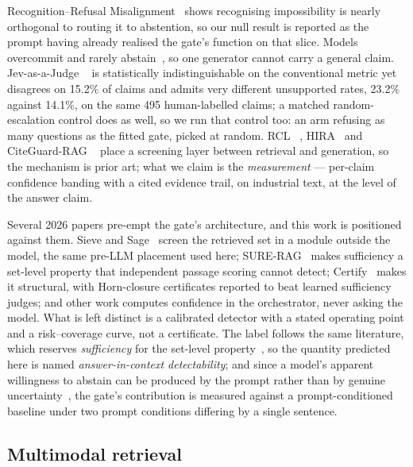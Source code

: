 \documentclass[conference]{IEEEtran}
\begin{document}
Recognition--Refusal Misalignment~\cite{du2026recognition} shows recognising
impossibility is nearly orthogonal to routing it to abstention, so our null
result is reported as the prompt having already realised the gate's function on
that slice. Models overcommit and rarely abstain~\cite{cocchieri2026overcommit},
so one generator cannot carry a general claim. Jev-as-a-Judge
~\cite{rosario2026jev} is statistically indistinguishable on the conventional
metric yet disagrees on 15.2\% of claims and admits very different unsupported
rates, 23.2\% against 14.1\%, on the same 495 human-labelled claims; a matched
random-escalation control does as well, so we run that control too: an arm
refusing as many questions as the fitted gate, picked at random. RCL
~\cite{ravuri2026rcl}, HIRA~\cite{tian2026hira} and CiteGuard-RAG
~\cite{zheng2026citeguard} place a screening layer between retrieval and
generation, so the mechanism is prior art; what we claim is the
\emph{measurement} --- per-claim confidence banding with a cited evidence
trail, on industrial text, at the level of the answer claim.

Several 2026 papers pre-empt the gate's architecture, and this work is
positioned against them. Sieve and Sage~\cite{won2026sievesage} screen the
retrieved set in a module outside the model, the same pre-LLM placement used
here; SURE-RAG~\cite{qiu2026surerag} makes sufficiency a set-level property
that independent passage scoring cannot detect; Certify~\cite{zhang2026certify}
makes it structural, with Horn-closure certificates reported to beat learned
sufficiency judges; and other work computes confidence in the orchestrator,
never asking the model. What is left distinct is a calibrated detector with a
stated operating point and a risk--coverage curve, not a certificate. The label
follows the same literature, which reserves \emph{sufficiency} for the
set-level property~\cite{li2026relevance}, so the quantity predicted here is
named \emph{answer-in-context detectability}; and since a model's apparent
willingness to abstain can be produced by the prompt rather than by genuine
uncertainty~\cite{ling2026promptartifact}, the gate's contribution is measured
against a prompt-conditioned baseline under two prompt conditions differing by
a single sentence.

\subsection{Multimodal retrieval}
\end{document}
